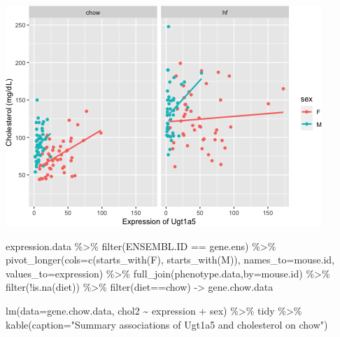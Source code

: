 \documentclass[
]{article}
\newenvironment{Shaded}{\begin{snugshade}}{\end{snugshade}}
\newcommand{\AttributeTok}[1]{\textcolor[rgb]{0.77,0.63,0.00}{#1}}
\newcommand{\FunctionTok}[1]{\textcolor[rgb]{0.00,0.00,0.00}{#1}}
\newcommand{\NormalTok}[1]{#1}
\newcommand{\OtherTok}[1]{\textcolor[rgb]{0.56,0.35,0.01}{#1}}
\newcommand{\SpecialCharTok}[1]{\textcolor[rgb]{0.00,0.00,0.00}{#1}}
\newcommand{\StringTok}[1]{\textcolor[rgb]{0.31,0.60,0.02}{#1}}
\begin{document}
\includegraphics{figures/Ugt1a5-associations-1.png}

\begin{Shaded}
\begin{Highlighting}[]
\NormalTok{expression.data }\SpecialCharTok{\%\textgreater{}\%}
  \FunctionTok{filter}\NormalTok{(ENSEMBL.ID }\SpecialCharTok{==}\NormalTok{ gene.ens) }\SpecialCharTok{\%\textgreater{}\%}
  \FunctionTok{pivot\_longer}\NormalTok{(}\AttributeTok{cols=}\FunctionTok{c}\NormalTok{(}\FunctionTok{starts\_with}\NormalTok{(}\StringTok{\textquotesingle{}F\textquotesingle{}}\NormalTok{),}
                      \FunctionTok{starts\_with}\NormalTok{(}\StringTok{\textquotesingle{}M\textquotesingle{}}\NormalTok{)),}
               \AttributeTok{names\_to=}\StringTok{\textquotesingle{}mouse.id\textquotesingle{}}\NormalTok{,}
               \AttributeTok{values\_to=}\StringTok{\textquotesingle{}expression\textquotesingle{}}\NormalTok{) }\SpecialCharTok{\%\textgreater{}\%}
  \FunctionTok{full\_join}\NormalTok{(phenotype.data,}\AttributeTok{by=}\StringTok{\textquotesingle{}mouse.id\textquotesingle{}}\NormalTok{) }\SpecialCharTok{\%\textgreater{}\%}
  \FunctionTok{filter}\NormalTok{(}\SpecialCharTok{!}\FunctionTok{is.na}\NormalTok{(diet)) }\SpecialCharTok{\%\textgreater{}\%}
  \FunctionTok{filter}\NormalTok{(diet}\SpecialCharTok{==}\StringTok{\textquotesingle{}chow\textquotesingle{}}\NormalTok{) }\OtherTok{{-}\textgreater{}}\NormalTok{ gene.chow.data}

\FunctionTok{lm}\NormalTok{(}\AttributeTok{data=}\NormalTok{gene.chow.data, chol2 }\SpecialCharTok{\textasciitilde{}}\NormalTok{ expression }\SpecialCharTok{+}\NormalTok{ sex) }\SpecialCharTok{\%\textgreater{}\%}
\NormalTok{  tidy }\SpecialCharTok{\%\textgreater{}\%}
  \FunctionTok{kable}\NormalTok{(}\AttributeTok{caption=}\StringTok{"Summary associations of Ugt1a5 and cholesterol on chow"}\NormalTok{)}
\end{Highlighting}
\end{Shaded}
\end{document}
